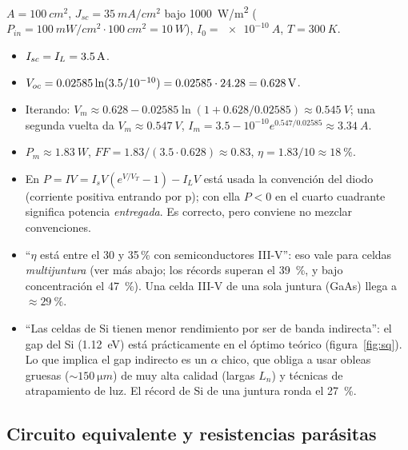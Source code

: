 \begin{ejemplo}
$A=\SI{100}{cm^2}$, $J_{sc}=\SI{35}{mA/cm^2}$ bajo \SI{1000}{W/m^2}
($P_{in}=\SI{100}{mW/cm^2}\cdot\SI{100}{cm^2}=\SI{10}{W}$), $I_0=\SI{e-10}{A}$, $T=\SI{300}{K}$.
\begin{itemize}[nosep]
  \item $I_{sc}=I_L=\SI{3.5}{A}$.
  \item $V_{oc}=0.02585\ln(3.5/10^{-10})=0.02585\cdot24.28=\SI{0.628}{V}$.
  \item Iterando: $V_m\approx0.628-0.02585\ln(1+0.628/0.02585)\approx\SI{0.545}{V}$; una
  segunda vuelta da $V_m\approx\SI{0.547}{V}$, $I_m=3.5-10^{-10}e^{0.547/0.02585}\approx\SI{3.34}{A}$.
  \item $P_m\approx\SI{1.83}{W}$, \quad $FF=1.83/(3.5\cdot0.628)\approx0.83$,
  \quad $\eta=1.83/10\approx\SI{18}{\percent}$.
\end{itemize}
\end{ejemplo}

\begin{ojo}[\diapo{27}]
\begin{itemize}
  \item En $P = IV = I_sV(e^{V/V_T}-1)-I_LV$ está usada la convención del diodo
  (corriente positiva entrando por p); con ella $P<0$ en el cuarto cuadrante significa
  potencia \emph{entregada}. Es correcto, pero conviene no mezclar convenciones.
  \item ``$\eta$ está entre el 30 y 35\,\% con semiconductores III-V'': eso vale para celdas
  \emph{multijuntura} (ver más abajo; los récords superan el \SI{39}{\percent}, y bajo
  concentración el \SI{47}{\percent}). Una celda III-V de una sola juntura (GaAs) llega a
  $\approx\SI{29}{\percent}$.
  \item ``Las celdas de Si tienen menor rendimiento por ser de banda indirecta'': el gap
  del Si (\SI{1.12}{\eV}) está prácticamente en el óptimo teórico (figura~\ref{fig:sq}). Lo
  que implica el gap indirecto es un $\alpha$ chico, que obliga a usar obleas gruesas
  ($\sim\SI{150}{\micro m}$) de muy alta calidad (largas $L_n$) y técnicas de atrapamiento
  de luz. El récord de Si de una juntura ronda el \SI{27}{\percent}.
\end{itemize}
\end{ojo}

\subsection{Circuito equivalente y resistencias parásitas}

